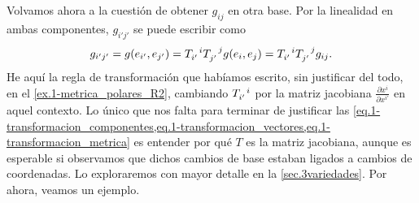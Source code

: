 Volvamos ahora a la cuestión de obtener \(g_{ij}\) en otra base. Por la linealidad en ambas componentes, \(g_{i'j'}\) se puede escribir como
\begin{equation}
    g_{i'j'} = g(e_{i'},e_{j'}) = \tensor{T}{_{i'}^i}\tensor{T}{_{j'}^j}g(e_{i},e_{j}) = \tensor{T}{_{i'}^i}\tensor{T}{_{j'}^j}g_{ij}.
\end{equation}
He aquí la regla de transformación que habíamos escrito, sin justificar del todo, en el \cref{ex.1-metrica_polares_R2}, cambiando \(\tensor{T}{_{i'}^{i}}\) por la matriz jacobiana \(\frac{\partial x^i}{\partial x^{i'}}\) en aquel contexto. Lo único que nos falta para terminar de justificar las \cref{eq.1-transformacion_componentes,eq.1-transformacion_vectores,eq.1-transformacion_metrica} es entender por qué \(T\) es la matriz jacobiana, aunque es esperable si observamos que dichos cambios de base estaban ligados a cambios de coordenadas. Lo exploraremos con mayor detalle en la \cref{sec.3variedades}. Por ahora, veamos un ejemplo.

